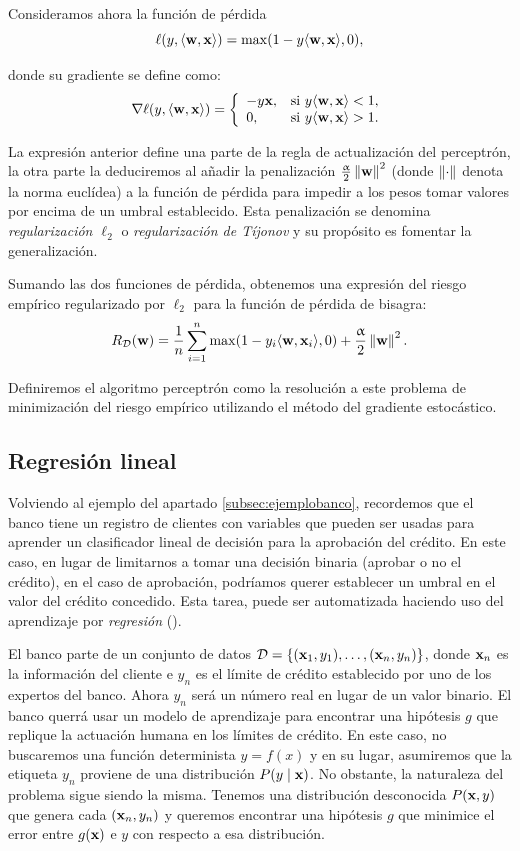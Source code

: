\documentclass[oneside,openright,titlepage,numbers=noenddot,openany,headinclude,footinclude=true,
cleardoublepage=empty,abstractoff,BCOR=5mm,paper=a4,fontsize=12pt,main=spanish]{scrreprt}
\begin{document}
Consideramos ahora la función de pérdida $$\ell(y,\langle \textbf{w},\textbf{x} \rangle)=\max (1-y\langle \textbf{w},\textbf{x} \rangle,0),$$

donde su gradiente se define como: $$\nabla \ell (y,\langle \textbf{w},\textbf{x} \rangle)=\left \{
\begin{array}{l l}
-y\textbf{x}, & \mbox{si } y\langle \textbf{w},\textbf{x} \rangle < 1, \\
0, & \mbox{si } y\langle \textbf{w},\textbf{x} \rangle > 1.
\end{array}
\right.$$

La expresión anterior define una parte de la regla de actualización del perceptrón, la otra parte la deduciremos al añadir la penalización $\frac{\upalpha}{2}\left\lVert\textbf{w}\right\rVert^2$ (donde $\left\lVert\cdot\right\rVert$ denota la norma euclídea) a la función de pérdida para impedir a los pesos tomar valores por encima de un umbral establecido. Esta penalización se denomina \textit{regularización $\ell_2$} o \textit{regularización de Tíjonov} y su propósito es fomentar la generalización.

Sumando las dos funciones de pérdida, obtenemos una expresión del riesgo empírico regularizado por $\ell_2$ para la función de pérdida de bisagra: $$R_{\mathcal{D}}(\textbf{w})=\frac{1}{n}\sum_{i=1}^n \max (1-y_i\langle \textbf{w},\textbf{x}_i \rangle,0)+\frac{\upalpha}{2}\left\lVert\textbf{w}\right\rVert^2.$$

Definiremos el algoritmo perceptrón como la resolución a este problema de minimización del riesgo empírico utilizando el método del gradiente estocástico.

\subsection{Regresión lineal}

Volviendo al ejemplo del apartado \ref{subsec:ejemplobanco}, recordemos que el banco tiene un registro de clientes con variables que pueden ser usadas para aprender un clasificador lineal de decisión para la aprobación del crédito. En este caso, en lugar de limitarnos a tomar una decisión binaria (aprobar o no el crédito), en el caso de aprobación, podríamos querer establecer un umbral en el valor del crédito concedido. Esta tarea, puede ser automatizada haciendo uso del aprendizaje por \textit{regresión} (\cite{learning2012}). 

El banco parte de un conjunto de datos $\mathcal{D}=\{(\textbf{x}_1,y_1),\dots,(\textbf{x}_n,y_n)\}$, donde $\textbf{x}_n$ es la información del cliente e $y_n$ es el límite de crédito establecido por uno de los expertos del banco. Ahora $y_n$ será un número real en lugar de un valor binario. El banco querrá usar un modelo de aprendizaje para encontrar una hipótesis $g$ que replique la actuación humana en los límites de crédito. En este caso, no buscaremos una función determinista $y = f(x)$ y en su lugar, asumiremos que la etiqueta $y_n$ proviene de una distribución $P(y \mid \textbf{x})$. No obstante, la naturaleza del problema sigue siendo la misma. Tenemos una distribución desconocida $P(\textbf{x}, y)$ que genera cada $(\textbf{x}_n, y_n)$ y queremos encontrar una hipótesis $g$ que minimice el error entre $g(\textbf{x})$ e $y$ con respecto a esa distribución.
\end{document}
